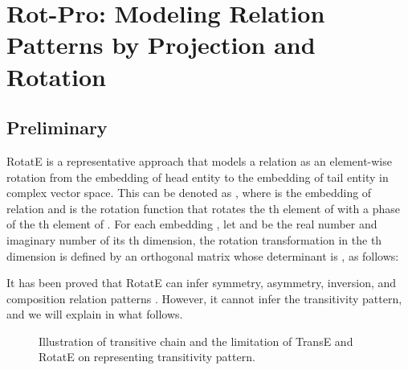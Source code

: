 \documentclass{article}
\begin{document}
\section{Rot-Pro: Modeling Relation Patterns by Projection and Rotation}
\label{sec:model}
\subsection{Preliminary}

RotatE is a representative approach that models a relation as an element-wise rotation from the embedding  of head entity to the embedding  of tail entity in complex vector space. This can be denoted as , where  is the embedding of relation  and  is the rotation function that rotates the th element of  with a phase of the th element of . For each embedding , let  and  be the real number and imaginary number of its th dimension, the rotation transformation in the th dimension is defined by an orthogonal matrix whose determinant is , as follows:


It has been proved that RotatE can infer symmetry, asymmetry, inversion, and composition relation patterns \cite{rotate}. However, it cannot infer the transitivity pattern, and we will explain in what follows.

\begin{figure}
\centering
{}
    \caption{Illustration of transitive chain and the limitation of TransE and RotatE on representing transitivity pattern.}
\end{figure}
\end{document}
